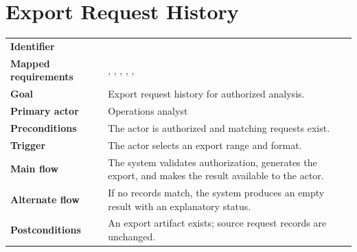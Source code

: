 \section{Export Request History}
\begin{tabularx}{\linewidth}{L{3.5cm}Y}
\toprule
\textbf{Identifier} & \\
\textbf{Mapped requirements} & , , , , , \\
\textbf{Goal} & Export request history for authorized analysis.\\
\textbf{Primary actor} & Operations analyst\\
\textbf{Preconditions} & The actor is authorized and matching requests exist.\\
\textbf{Trigger} & The actor selects an export range and format.\\
\textbf{Main flow} & The system validates authorization, generates the export, and makes the result available to the actor.\\
\textbf{Alternate flow} & If no records match, the system produces an empty result with an explanatory status.\\
\textbf{Postconditions} & An export artifact exists; source request records are unchanged.\\
\bottomrule
\end{tabularx}
